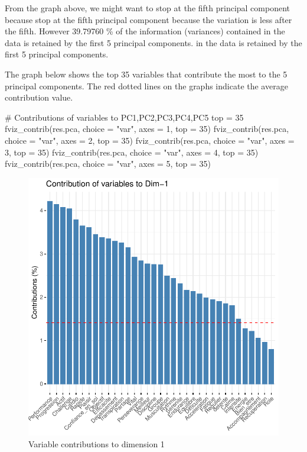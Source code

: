 \documentclass[12pt]{article}
\begin{document}
From the graph above, we might want to stop at the fifth principal component because 
stop at the fifth principal component because the variation is less after the fifth.
However 39.79760 \% of the information (variances) contained in the data is retained by the first 5 principal components.
in the data is retained by the first 5 principal components.


The graph below shows the top 35 variables that contribute the most to the 5 principal components. 
The red dotted lines on the graphs indicate the average contribution value.
 
\begin{customFrame}
# Contributions of variables to PC1,PC2,PC3,PC4,PC5 top = 35 
fviz_contrib(res.pca, choice = "var", axes = 1, top = 35) 
fviz_contrib(res.pca, choice = "var", axes = 2, top = 35) 
fviz_contrib(res.pca, choice = "var", axes = 3, top = 35) 
fviz_contrib(res.pca, choice = "var", axes = 4, top = 35) 
fviz_contrib(res.pca, choice = "var", axes = 5, top = 35) 
\end{customFrame}




\begin{figure}[H]
\begin{center}
\includegraphics[scale=1.1]{ACP_1.pdf} 
\caption[]{ Variable contributions to  dimension 1 }
\end{center}
\end{figure}
\end{document}
